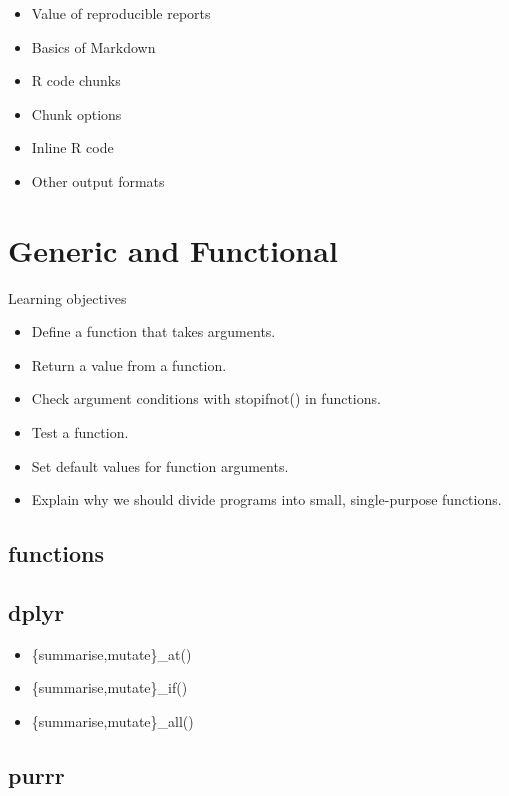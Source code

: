 \documentclass[]{book}
\providecommand{\tightlist}{%
  \setlength{\itemsep}{0pt}\setlength{\parskip}{0pt}}
\begin{document}
\begin{itemize}
\tightlist
\item
  Value of reproducible reports
\item
  Basics of Markdown
\item
  R code chunks
\item
  Chunk options
\item
  Inline R code
\item
  Other output formats
\end{itemize}

\hypertarget{generic-and-functional}{%
\chapter{Generic and Functional}\label{generic-and-functional}}

Learning objectives

\begin{itemize}
\tightlist
\item
  Define a function that takes arguments.
\item
  Return a value from a function.
\item
  Check argument conditions with stopifnot() in functions.
\item
  Test a function.
\item
  Set default values for function arguments.
\item
  Explain why we should divide programs into small, single-purpose
  functions.
\end{itemize}

\hypertarget{functions}{%
\section{functions}\label{functions}}

\hypertarget{dplyr}{%
\section{dplyr}\label{dplyr}}

\begin{itemize}
\tightlist
\item
  \{summarise,mutate\}\_at()
\item
  \{summarise,mutate\}\_if()
\item
  \{summarise,mutate\}\_all()
\end{itemize}

\hypertarget{purrr}{%
\section{purrr}\label{purrr}}
\end{document}
